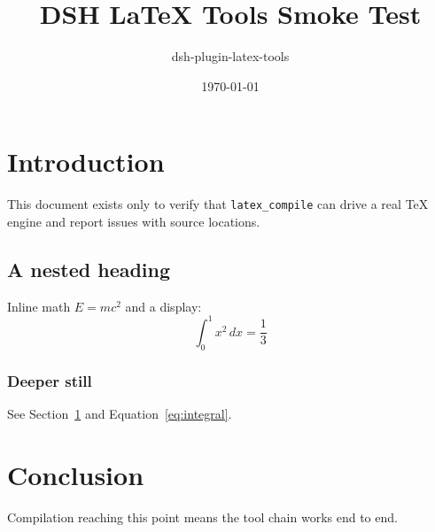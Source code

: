 \documentclass[11pt]{article}
\title{DSH LaTeX Tools Smoke Test}
\author{dsh-plugin-latex-tools}
\date{\today}
\begin{document}
\maketitle

\section{Introduction}
\label{sec:intro}
This document exists only to verify that \texttt{latex\_compile} can drive a real
\TeX{} engine and report issues with source locations.

\subsection{A nested heading}
Inline math $E = mc^2$ and a display:
\begin{equation}
  \int_0^1 x^2 \, dx = \frac{1}{3}
  \label{eq:integral}
\end{equation}

\subsubsection{Deeper still}
See Section~\ref{sec:intro} and Equation~\ref{eq:integral}.

\section{Conclusion}
Compilation reaching this point means the tool chain works end to end.
\end{document}
